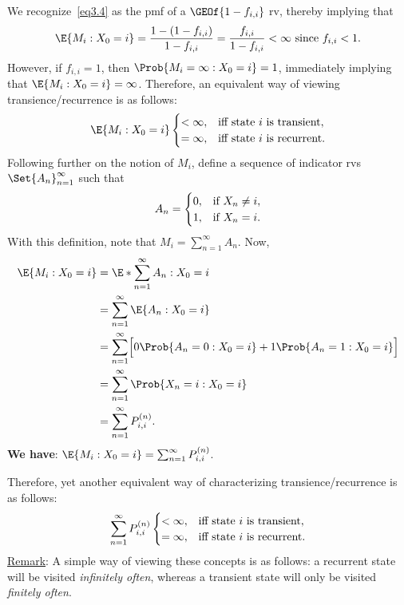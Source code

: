 \begin{Regular}
    We recognize~\ref{eq3.4} as the pmf of a $ \GEOf{1-f_{i,i}} $ rv, thereby implying that
    \[ \E{M_i\given X_0=i}=\frac{1-(1-f_{i,i})}{1-f_{i,i}} =\frac{f_{i,i}}{1-f_{i,i}} <\infty\text{ since }f_{i,i}<1. \]
    However, if $ f_{i,i}=1 $, then $ \Prob{M_i=\infty\given X_0=i}=1 $, immediately implying that $ \E{M_i\given X_0=i}=\infty $.
    Therefore, an equivalent way of viewing transience/recurrence is as follows:
    \[ \E{M_i\given X_0=i}\begin{cases}
            <\infty, & \text{iff state $ i $ is transient}, \\
            =\infty, & \text{iff state $ i $ is recurrent}.
        \end{cases} \]
    Following further on the notion of $ M_i $, define a sequence of indicator rvs $ \Set{A_n}_{n=1}^\infty $ such that
    \[ A_n=\begin{cases}
            0, & \text{if $ X_n\ne i $}, \\
            1, & \text{if $ X_n=i $}.
        \end{cases} \]
    With this definition, note that $ M_i=\sum_{n=1}^{\infty} A_n $. Now,
    \begin{align*}
        \E{M_i\given X_0=i}
         & =\E*{\sum_{n=1}^{\infty} A_n\given X_0=i}                                            \\
         & =\sum_{n=1}^{\infty} \E{A_n\given X_0=i}                                             \\
         & =\sum_{n=1}^{\infty} \Bigl[0\Prob{A_n=0\given X_0=i}+1\Prob{A_n=1\given X_0=i}\Bigr] \\
         & =\sum_{n=1}^{\infty} \Prob{X_n=i\given X_0=i}                                        \\
         & =\sum_{n=1}^{\infty} P_{i,i}^{(n)}.
    \end{align*}
    \textbf{We have}: $ \E{M_i\given X_0=i}=\sum_{n=1}^{\infty} P_{i,i}^{(n)} $.

    Therefore, yet another equivalent way of characterizing transience/recurrence is as follows:
    \[ \sum_{n=1}^{\infty} P_{i,i}^{(n)}\begin{cases}
            <\infty, & \text{iff state $ i $ is transient}, \\
            =\infty, & \text{iff state $ i $ is recurrent}.
        \end{cases} \]
    \underline{Remark}: A simple way of viewing these concepts is as follows: a recurrent state will be visited
    \emph{infinitely often}, whereas a transient state will only be visited \emph{finitely often}.
\end{Regular}
